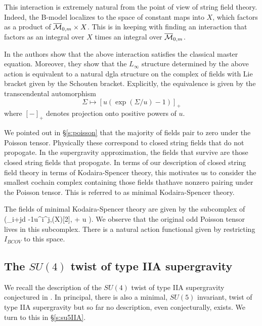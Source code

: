 This interaction is extremely natural from the point of view of string field theory. Indeed, the B-model localizes to the space of constant maps into $X$, which factors as a product of $\overline{\mathcal M}_{0,m}\times X$. This is in keeping with finding an interaction that factors as an integral over $X$ times an integral over $\overline{\mathcal M}_{0,m}$. 

In \cite{BCOV} the authors show that the above interaction satisfies the classical master equation. Moreover, they show that the $L_\infty$ structure determined by the above action is equivalent to a natural dgla structure on the complex of fields with Lie bracket given by the Schouten bracket. Explicitly, the equivalence is given by the transcendental automorphism 
\[
\Sigma \mapsto [u(\exp (\Sigma/u)-1)]_+
\]
where $[-]_+$ denotes projection onto positive powers of $u$.

\parsec[s:minimalks]

We pointed out in \S\ref{s:poisson} that the majority of fields pair to zero under the Poisson tensor. Physically these correspond to closed string fields that do not propogate. In the supergravity approximation, the fields that survive are those closed string fields that propogate. In terms of our description of closed string field theory in terms of Kodaira-Spencer theory, this motivates us to consider the smallest cochain complex containing those fields thathave nonzero pairing under the Poisson tensor. This is referred to as minimal Kodaira-Spencer theory.

The fields of minimal Kodaira-Spencer theory are given by the subcomplex of \label{eqn:ks1}
\beqn
\left (\bigoplus_{i+j\leq d -1}u^i\PV^{j,\bu}(X)[2], \dbar + u \div\right).
\eeqn
We observe that the original odd Poisson tensor lives in this subcomplex. 
There is a natural action functional given by restricting $I_{BCOV}$ to this space.

\subsection{The $SU(4)$ twist of type IIA supergravity}\label{sec:SU(4)twist}

We recall the description of the $SU(4)$ twist of type IIA supergravity conjectured in \cite{CLsugra}. 
In principal, there is also a minimal, $SU(5)$ invariant, twist of type IIA supergravity but so far no description, even conjecturally, exists.
We turn to this in \S \ref{s:su5IIA}. 

